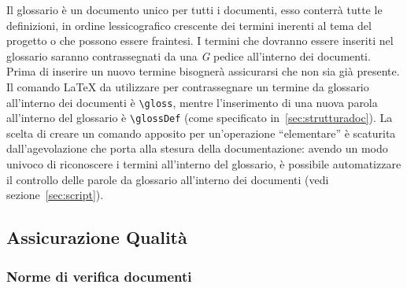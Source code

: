 \documentclass{scalatekids-article}
\begin{document}
Il glossario è un documento unico per tutti i documenti, esso conterrà tutte le
definizioni, in ordine lessicografico crescente dei termini inerenti al tema
del progetto o che possono essere fraintesi. I termini che dovranno essere
inseriti nel glossario saranno contrassegnati da una \textit{G} pedice
all'interno dei documenti. Prima di inserire un nuovo termine bisognerà
assicurarsi che non sia già presente.\\ Il comando \LaTeX\xspace da utilizzare
per contrassegnare un termine da glossario all'interno dei documenti è
\verb=\gloss=, mentre l'inserimento di una nuova parola all'interno del
glossario è \verb=\glossDef= (come specificato in~\ref{sec:strutturadoc}). La
scelta di creare un comando apposito per un'operazione ``elementare'' è
scaturita dall'agevolazione che porta alla stesura della documentazione: avendo
un modo univoco di riconoscere i termini all'interno del glossario, è possibile
automatizzare il controllo delle parole da glossario all'interno dei
documenti (vedi sezione~\ref{sec:script}).

\subsection{Assicurazione Qualità}

\subsubsection{Norme di verifica documenti}

\label{sec:VerificaDocumenti}
\end{document}
